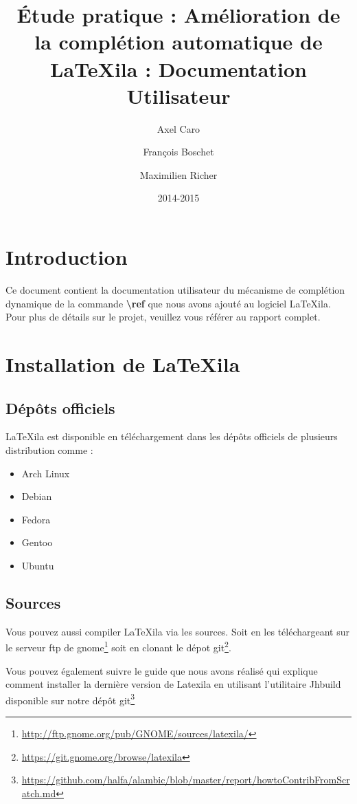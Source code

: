 \documentclass[a4paper,11pt]{report}
\title{Étude pratique : Amélioration de la complétion automatique de \LaTeX{}ila  : Documentation Utilisateur}
\author{Axel Caro\and François Boschet\and Maximilien Richer}
\date{2014-2015}
\begin{document}


\maketitle %

\chapter{Introduction}
\label{cha:Introduction}
Ce document contient la documentation utilisateur du mécanisme de complétion dynamique de la commande \textbf{\textbackslash{}ref} que nous avons ajouté au logiciel \LaTeX{}ila.
Pour plus de détails sur le projet, veuillez vous référer au rapport complet.

\chapter{Installation de \LaTeX{}ila}
\label{cha:Installation}

\section{Dépôts officiels}
\label{sec:depots}

\LaTeX{}ila est disponible en téléchargement dans les dépôts officiels de plusieurs distribution comme :
\begin{itemize}
\item Arch Linux
\item Debian
\item Fedora
\item Gentoo
\item Ubuntu
\end{itemize}

\section{Sources}
\label{sec:sources}

Vous pouvez aussi compiler \LaTeX{}ila via les sources. Soit en les téléchargeant sur le serveur ftp de gnome\footnote{\url{http://ftp.gnome.org/pub/GNOME/sources/latexila/}} soit en clonant le dépot git\footnote{\url{https://git.gnome.org/browse/latexila}}.

Vous pouvez également suivre le guide que nous avons réalisé qui explique comment installer la dernière version de Latexila en utilisant l'utilitaire Jhbuild disponible sur notre dépôt git\footnote{\url{https://github.com/halfa/alambic/blob/master/report/howtoContribFromScratch.md}}
\end{document}
